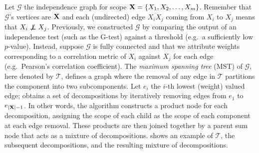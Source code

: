 Let $\mathcal{G}$ the independence graph for scope $\mathbf{X}=\{X_1,X_2,\ldots,X_m\}$. Remember that
$\mathcal{G}$'s vertices are $\mathbf{X}$ and each (undirected) edge $\overline{X_i X_j}$ coming from
$X_i$ to $X_j$ means that $X_i\notindep X_j$. Previously, we constructed $\mathcal{G}$ by comparing
the output of an independence test (such as the G-test) against a threshold (e.g.\ a sufficiently
low $p$-value). Instead, suppose $\mathcal{G}$ is fully connected and that we attribute weights
corresponding to a correlation metric of $X_i$ against $X_j$ for each edge (e.g.\ Pearson's
correlation coefficient). The \emph{maximum spanning tree} (MST) of $\mathcal{G}$, here denoted by
$\mathcal{T}$, defines a graph where the removal of any edge in $\mathcal{T}$ partitions the
component into two subcomponents. Let $e_i$ the $i$-th lowest (weight) valued edge;
 obtains a set of decompositions by iteratively removing edges from $e_1$ to
$e_{|\mathbf{X}|-1}$. In other words, the algorithm constructs a product node for each decomposition,
assigning the scope of each child as the scope of each component at each edge removal. These
products are then joined together by a parent sum node that acts as a mixture of decompositions.
 shows an example of $\mathcal{T}$, the subsequent decompositions, and the
resulting mixture of decompositions.

